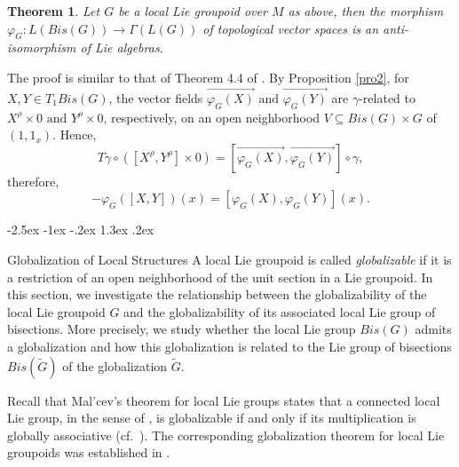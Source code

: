 \documentclass[12pt,a4paper]{amsart}
\makeatletter
\def\section{\@startsection{section}{1}{\z@}%
  {-2.5ex \@plus -1ex \@minus -.2ex}%
  {1.3ex \@plus.2ex}%
  {\normalfont\large\bfseries\raggedright}}
\theoremstyle{plain}
\newtheorem{theorem}{Theorem}[section]
\theoremstyle{definition}
\renewenvironment{proof}[1][\proofname]{%
  \par\vspace{0.1em} %
  \pushQED{\qed}%
  \normalfont \topsep0pt \trivlist
  \item[\hskip\labelsep\itshape #1\@addpunct{.}]\ignorespaces
}{%
  \popQED\endtrivlist\@endpefalse
}
\makeatother
\begin{document}
\begin{theorem}
    Let $G$ be a local Lie groupoid  over $M$ as above, then the morphism  $\varphi_G : L(Bis(G))\rightarrow \Gamma(L(G))$ of topological vector spaces is an anti-isomorphism of Lie algebras.
\end{theorem}
\begin{proof}
The proof is similar to that of Theorem 4.4 of \cite{Schmeding}. 
By Proposition \ref{pro2}, for $X,Y\in T_1 Bis(G)$, the vector fields
$\overrightarrow{\varphi_G(X)}
\,\, \text{and} \,\,
\overrightarrow{\varphi_G(Y)}$ 
are $\gamma$-related to $X^\rho\times 0
\,\, \text{and} \,\,
Y^\rho\times 0$,
respectively, on an open neighborhood
$V\subseteq Bis(G)\times G
$ of $(1,1_x)$. Hence,
\[
T\gamma\circ([X^\rho,Y^\rho]\times 0)
=
[\overrightarrow{\varphi_G(X)},
\overrightarrow{\varphi_G(Y)}]\circ\gamma,
\]
therefore,
\[
-\varphi_G([X,Y])(x)
=
[\varphi_G(X),\varphi_G(Y)](x).
\]

\end{proof}
\section{Globalization of Local Structures}
A local Lie groupoid is called \textit{globalizable} if it is a restriction of an open neighborhood of the unit section in a Lie groupoid. In this section, we investigate the relationship between the globalizability of the local Lie groupoid $G$ and the globalizability of its associated local Lie group of bisections. More precisely, we study whether the local Lie group $Bis(G)$ admits a globalization and how this globalization is related to the Lie group of bisections $Bis(\widetilde{G})$ of the 
globalization $\widetilde{G}$.

Recall that Mal'cev's theorem for local Lie groups states that a connected local Lie group, in the sense of \cite[Definition 13]{Olver}, is globalizable if and only if its multiplication is globally associative (cf.~\cite{Olver,Malcev}).
The corresponding globalization theorem for local Lie groupoids was established in \cite{Fernandes}.
\end{document}
